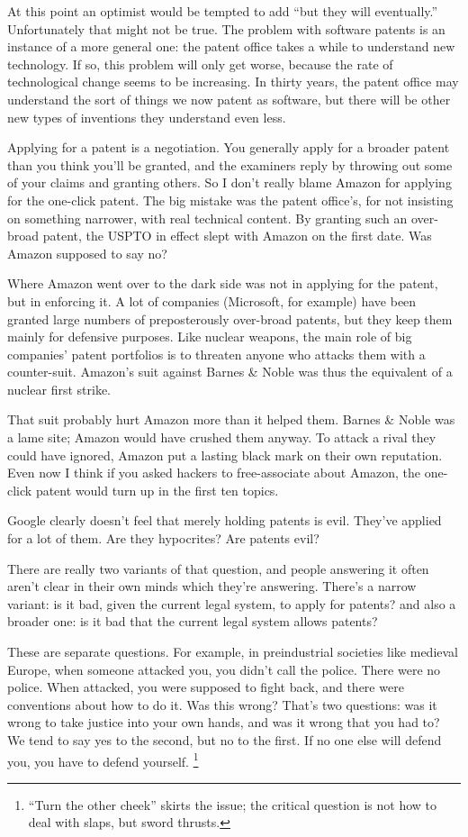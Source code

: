 \documentclass[12pt]{book}
\begin{document}
At this point an optimist would be tempted to add ``but they will
eventually.'' Unfortunately that might not be true. The problem with
software patents is an instance of a more general one: the patent office
takes a while to understand new technology. If so, this problem will
only get worse, because the rate of technological change seems to be
increasing. In thirty years, the patent office may understand the sort
of things we now patent as software, but there will be other new types
of inventions they understand even less.

Applying for a patent is a negotiation. You generally apply for a
broader patent than you think you'll be granted, and the examiners reply
by throwing out some of your claims and granting others. So I don't
really blame Amazon for applying for the one-click patent. The big
mistake was the patent office's, for not insisting on something
narrower, with real technical content. By granting such an over-broad
patent, the USPTO in effect slept with Amazon on the first date. Was
Amazon supposed to say no?

Where Amazon went over to the dark side was not in applying for the
patent, but in enforcing it. A lot of companies (Microsoft, for example)
have been granted large numbers of preposterously over-broad patents,
but they keep them mainly for defensive purposes. Like nuclear weapons,
the main role of big companies' patent portfolios is to threaten anyone
who attacks them with a counter-suit. Amazon's suit against Barnes \&
Noble was thus the equivalent of a nuclear first strike.

That suit probably hurt Amazon more than it helped them. Barnes \& Noble
was a lame site; Amazon would have crushed them anyway. To attack a
rival they could have ignored, Amazon put a lasting black mark on their
own reputation. Even now I think if you asked hackers to free-associate
about Amazon, the one-click patent would turn up in the first ten
topics.

Google clearly doesn't feel that merely holding patents is evil. They've
applied for a lot of them. Are they hypocrites? Are patents evil?

There are really two variants of that question, and people answering it
often aren't clear in their own minds which they're answering. There's a
narrow variant: is it bad, given the current legal system, to apply for
patents? and also a broader one: is it bad that the current legal system
allows patents?

These are separate questions. For example, in preindustrial societies
like medieval Europe, when someone attacked you, you didn't call the
police. There were no police. When attacked, you were supposed to fight
back, and there were conventions about how to do it. Was this wrong?
That's two questions: was it wrong to take justice into your own hands,
and was it wrong that you had to? We tend to say yes to the second, but
no to the first. If no one else will defend you, you have to defend
yourself. \footnote{``Turn the other cheek'' skirts the issue; the critical question
is not how to deal with slaps, but sword thrusts.}
\end{document}
